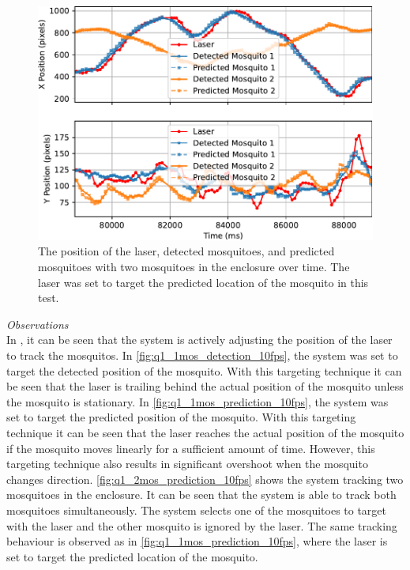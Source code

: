 \begin{figure}[h]
  \centering
  \includegraphics[width=\textwidth]{figures/results/q1_2mos_prediction_10fps.pdf}
  \caption{The position of the laser, detected mosquitoes, and predicted mosquitoes with two mosquitoes in the enclosure over time. The laser was set to target the predicted location of the mosquito in this test.}
  \label{fig:q1_2mos_prediction_10fps}
\end{figure}

\textit{Observations}\\
In , it can be seen that the system is actively adjusting the position of the laser to track the mosquitos. In \autoref{fig:q1_1mos_detection_10fps}, the system was set to target the detected position of the mosquito. With this targeting technique it can be seen that the laser is trailing behind the actual position of the mosquito unless the mosquito is stationary. In \autoref{fig:q1_1mos_prediction_10fps}, the system was set to target the predicted position of the mosquito. With this targeting technique it can be seen that the laser reaches the actual position of the mosquito if the mosquito moves linearly for a sufficient amount of time. However, this targeting technique also results in significant overshoot when the mosquito changes direction. \autoref{fig:q1_2mos_prediction_10fps} shows the system tracking two mosquitoes in the enclosure. It can be seen that the system is able to track both mosquitoes simultaneously. The system selects one of the mosquitoes to target with the laser and the other mosquito is ignored by the laser. The same tracking behaviour is observed as in \autoref{fig:q1_1mos_prediction_10fps}, where the laser is set to target the predicted location of the mosquito.

